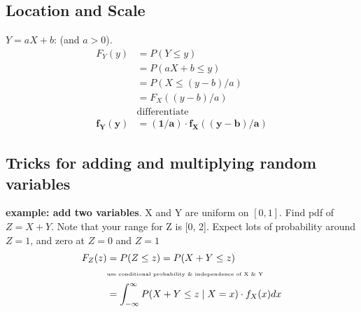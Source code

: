 \subsection{Location and Scale}
\textbf{$Y = aX + b $}: (and $a > 0$). 
\begin{align*}
	F_Y(y) &= P(Y \leq y) \\
			&= P(aX + b \leq y)  \\
			&= P(X \leq (y-b)/a)  \\
			&= F_X((y-b)/a)  \\
			& \mbox{differentiate} \\
		\mathbf{f_Y(y)} & \mathbf{= (1/a) \cdot f_X((y-b)/a)}
\end{align*}

\subsection{Tricks for adding and multiplying random variables}

\textbf{example: add two variables}.  X and Y are uniform on $[0,1]$.  Find pdf of $Z = X + Y$.  Note that your range for Z is [0, 2].  Expect lots of probability around $Z = 1$, and zero at $Z = 0$ and $Z = 1$ 
\begin{align*}
	F_Z(z) &= P(Z \leq z) = P(X + Y \leq z) \\
	& \mbox{\tiny use conditional probability \& independence of X \& Y} \\
	&= \int_{- \infty}^{\infty} P(X + Y \leq z \mid X = x) \cdot f_X(x)dx
\end{align*}


